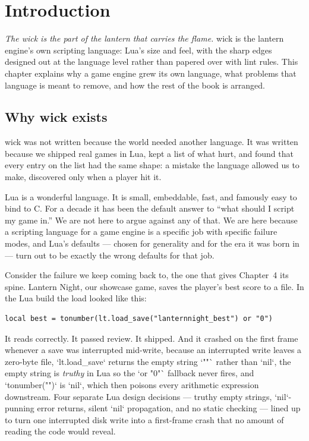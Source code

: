 \chapter{Introduction}

\emph{The wick is the part of the lantern that carries the flame.} wick is
the lantern engine's own scripting language: Lua's size and feel, with the
sharp edges designed out at the language level rather than papered over with
lint rules. This chapter explains why a game engine grew its own language,
what problems that language is meant to remove, and how the rest of the book
is arranged.

\section{Why wick exists}

wick was not written because the world needed another language. It was
written because we shipped real games in Lua, kept a list of what hurt, and
found that every entry on the list had the same shape: a mistake the
language allowed us to make, discovered only when a player hit it.

Lua is a wonderful language. It is small, embeddable, fast, and famously
easy to bind to C. For a decade it has been the default answer to ``what
should I script my game in.'' We are not here to argue against any of that.
We are here because a scripting language for a game engine is a specific job
with specific failure modes, and Lua's defaults --- chosen for generality and
for the era it was born in --- turn out to be exactly the wrong defaults for
that job.

Consider the failure we keep coming back to, the one that gives Chapter~4 its
spine. Lantern Night, our showcase game, saves the player's best score to a
file. In the Lua build the load looked like this:

\begin{lstlisting}[language=luatwin]
local best = tonumber(lt.load_save("lanternnight_best") or "0")
\end{lstlisting}

\noindent
It reads correctly. It passed review. It shipped. And it crashed on the
first frame whenever a save was interrupted mid-write, because an
interrupted write leaves a zero-byte file, `lt.load_save` returns the empty
string `""` rather than `nil`, the empty string is \emph{truthy} in Lua so
the `or "0"` fallback never fires, and `tonumber("")` is `nil`, which then
poisons every arithmetic expression downstream. Four separate Lua design
decisions --- truthy empty strings, `nil`-punning error returns, silent `nil`
propagation, and no static checking --- lined up to turn one interrupted disk
write into a first-frame crash that no amount of reading the code would
reveal.

